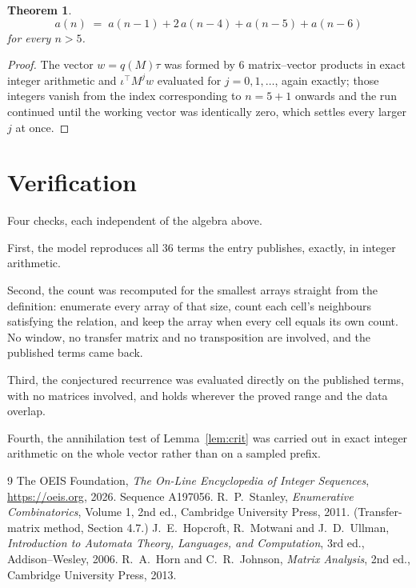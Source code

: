 \documentclass[11pt,a4paper]{article}
\theoremstyle{plain}
\newtheorem{theorem}{Theorem}
\theoremstyle{definition}
\begin{document}
\begin{theorem}
\[
a(n)\;=\;a(n-1) + 2\,a(n-4) + a(n-5) + a(n-6)
\]
for every $n>5$.
\end{theorem}

\begin{proof}
The vector $w=q(M)\tau$ was formed by $6$ matrix--vector products in exact integer
arithmetic and $\iota^{\!\top}M^{j}w$ evaluated for $j=0,1,\dots$, again exactly; those
integers vanish from the index corresponding to $n=5+1$ onwards and the run continued
until the working vector was identically zero, which settles every larger $j$ at once.
\end{proof}

\section{Verification}

Four checks, each independent of the algebra above.

First, the model reproduces all $36$ terms the entry publishes, exactly, in integer
arithmetic.

Second, the count was recomputed for the smallest arrays straight from the definition:
enumerate every array of that size, count each cell's neighbours satisfying the relation, and
keep the array when every cell equals its own count. No window, no transfer matrix and no
transposition are involved, and the published terms came back.

Third, the conjectured recurrence was evaluated directly on the published terms, with no
matrices involved, and holds wherever the proved range and the data overlap.

Fourth, the annihilation test of Lemma~\ref{lem:crit} was carried out in exact integer
arithmetic on the whole vector rather than on a sampled prefix.

\begin{thebibliography}{9}
 The OEIS Foundation, \emph{The On-Line Encyclopedia of Integer
Sequences}, \url{https://oeis.org}, 2026. Sequence A197056.
 R.~P.~Stanley, \emph{Enumerative Combinatorics}, Volume 1, 2nd ed.,
Cambridge University Press, 2011. (Transfer-matrix method, Section 4.7.)
 J.~E.~Hopcroft, R.~Motwani and J.~D.~Ullman, \emph{Introduction to Automata
Theory, Languages, and Computation}, 3rd ed., Addison--Wesley, 2006.
 R.~A.~Horn and C.~R.~Johnson, \emph{Matrix Analysis}, 2nd ed., Cambridge
University Press, 2013.
\end{thebibliography}
\end{document}
